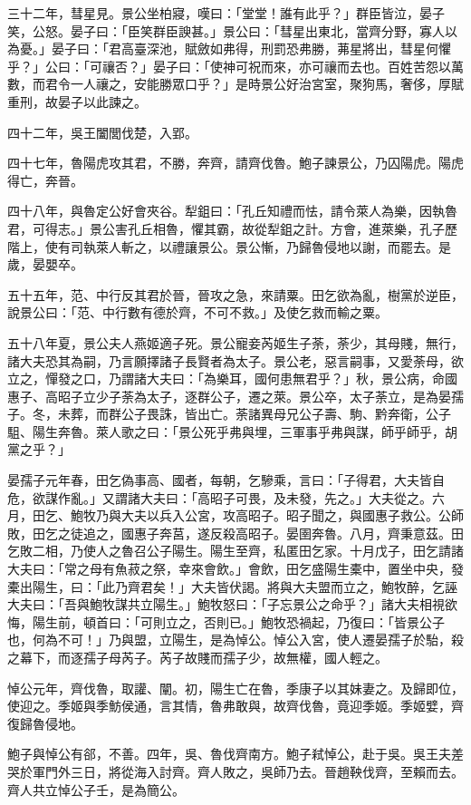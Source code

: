\begin{pinyinscope}
三十二年，彗星見。景公坐柏寢，嘆曰：「堂堂！誰有此乎？」群臣皆泣，晏子笑，公怒。晏子曰：「臣笑群臣諛甚。」景公曰：「彗星出東北，當齊分野，寡人以為憂。」晏子曰：「君高臺深池，賦斂如弗得，刑罰恐弗勝，茀星將出，彗星何懼乎？」公曰：「可禳否？」晏子曰：「使神可祝而來，亦可禳而去也。百姓苦怨以萬數，而君令一人禳之，安能勝眾口乎？」是時景公好治宮室，聚狗馬，奢侈，厚賦重刑，故晏子以此諫之。

四十二年，吳王闔閭伐楚，入郢。

四十七年，魯陽虎攻其君，不勝，奔齊，請齊伐魯。鮑子諫景公，乃囚陽虎。陽虎得亡，奔晉。

四十八年，與魯定公好會夾谷。犁鉏曰：「孔丘知禮而怯，請令萊人為樂，因執魯君，可得志。」景公害孔丘相魯，懼其霸，故從犁鉏之計。方會，進萊樂，孔子歷階上，使有司執萊人斬之，以禮讓景公。景公慚，乃歸魯侵地以謝，而罷去。是歲，晏嬰卒。

五十五年，范、中行反其君於晉，晉攻之急，來請粟。田乞欲為亂，樹黨於逆臣，說景公曰：「范、中行數有德於齊，不可不救。」及使乞救而輸之粟。

五十八年夏，景公夫人燕姬適子死。景公寵妾芮姬生子荼，荼少，其母賤，無行，諸大夫恐其為嗣，乃言願擇諸子長賢者為太子。景公老，惡言嗣事，又愛荼母，欲立之，憚發之口，乃謂諸大夫曰：「為樂耳，國何患無君乎？」秋，景公病，命國惠子、高昭子立少子荼為太子，逐群公子，遷之萊。景公卒，太子荼立，是為晏孺子。冬，未葬，而群公子畏誅，皆出亡。荼諸異母兄公子壽、駒、黔奔衛，公子駔、陽生奔魯。萊人歌之曰：「景公死乎弗與埋，三軍事乎弗與謀，師乎師乎，胡黨之乎？」

晏孺子元年春，田乞偽事高、國者，每朝，乞驂乘，言曰：「子得君，大夫皆自危，欲謀作亂。」又謂諸大夫曰：「高昭子可畏，及未發，先之。」大夫從之。六月，田乞、鮑牧乃與大夫以兵入公宮，攻高昭子。昭子聞之，與國惠子救公。公師敗，田乞之徒追之，國惠子奔莒，遂反殺高昭子。晏圉奔魯。八月，齊秉意茲。田乞敗二相，乃使人之魯召公子陽生。陽生至齊，私匿田乞家。十月戊子，田乞請諸大夫曰：「常之母有魚菽之祭，幸來會飲。」會飲，田乞盛陽生橐中，置坐中央，發橐出陽生，曰：「此乃齊君矣！」大夫皆伏謁。將與大夫盟而立之，鮑牧醉，乞誣大夫曰：「吾與鮑牧謀共立陽生。」鮑牧怒曰：「子忘景公之命乎？」諸大夫相視欲悔，陽生前，頓首曰：「可則立之，否則已。」鮑牧恐禍起，乃復曰：「皆景公子也，何為不可！」乃與盟，立陽生，是為悼公。悼公入宮，使人遷晏孺子於駘，殺之幕下，而逐孺子母芮子。芮子故賤而孺子少，故無權，國人輕之。

悼公元年，齊伐魯，取讙、闡。初，陽生亡在魯，季康子以其妹妻之。及歸即位，使迎之。季姬與季魴侯通，言其情，魯弗敢與，故齊伐魯，竟迎季姬。季姬嬖，齊復歸魯侵地。

鮑子與悼公有郤，不善。四年，吳、魯伐齊南方。鮑子弒悼公，赴于吳。吳王夫差哭於軍門外三日，將從海入討齊。齊人敗之，吳師乃去。晉趙鞅伐齊，至賴而去。齊人共立悼公子壬，是為簡公。


\end{pinyinscope}
